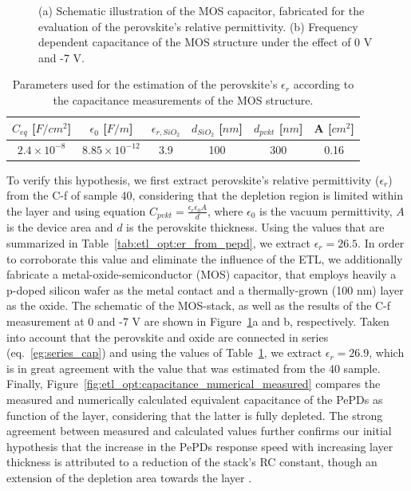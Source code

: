 \begin{figure}[htbp]
    \caption[Schematic illustration of perovskite MOS capacitor and frequency-dependent capacitance results.]{(a) Schematic illustration of the MOS capacitor, fabricated for the evaluation of the perovskite's relative permittivity. (b) Frequency dependent capacitance of the MOS structure under the effect of 0 V and -7 V. }
    \label{etl:mos_stack}
\end{figure}


\begin{table}[htbp]
    \centering
    \caption{Parameters used for the estimation of the perovskite’s $\epsilon_r$ according to the capacitance measurements of the MOS structure.}
    \renewcommand{\arraystretch}{1.5}
    \begin{tabular}{| c | c | c | c | c | c |}
        \hline
        $C_{eq}$ [$F/cm^2$] & $\epsilon_0$ [$F/m$] & $\epsilon_{r,SiO_2}$ & $d_{SiO_2}$ [$nm$] & $d_{pvkt}$ [$nm$] & A [$cm^2$] \\
        \hline
        $2.4\times10^{-8}$ & $8.85\times10^{-12}$ & 3.9 & 100 & 300 & 0.16 \\
        \hline
    \end{tabular}
    
    \label{tab:etl_opt:er_from_mos}
\end{table}



To verify this hypothesis, we first extract perovskite's relative permittivity ($\epsilon_r$) from the C-f of sample 40, considering that the depletion region is limited within the  layer and using equation $C_{pvkt} = \frac{\epsilon_r\epsilon_0A}{d}$, where $\epsilon_0$ is the vacuum permittivity, $A$ is the device area and $d$ is the perovskite thickness. Using the values that are summarized in Table~\ref{tab:etl_opt:er_from_pepd}, we extract $\epsilon_r = 26.5$. In order to corroborate this value and eliminate the influence of the ETL, we additionally fabricate a metal-oxide-semiconductor (MOS) capacitor, that employs heavily a p-doped silicon wafer as the metal contact and a thermally-grown  (100 nm) layer as the oxide. The schematic of the MOS-stack, as well as the results of the C-f measurement at 0 and -7 V are shown in Figure~\ref{etl:mos_stack}a and b, respectively. Taken into account that the perovskite and oxide are connected in series (eq.~\ref{eg:series_cap}) and using the values of Table~\ref{tab:etl_opt:er_from_mos}, we extract $\epsilon_r = 26.9$, which is in great agreement with the value that was estimated from the 40 sample. Finally, Figure~\ref{fig:etl_opt:capacitance_numerical_measured} compares the measured and numerically calculated equivalent capacitance of the PePDs as function of the  layer, considering that the latter is fully depleted. The strong agreement between measured and calculated values further confirms our initial hypothesis that the increase in the PePDs response speed with increasing  layer thickness is attributed to a reduction of the stack's RC constant, though an extension of the depletion area towards the  layer \cite{Goushcha2017OnPhotodiodes}. 


